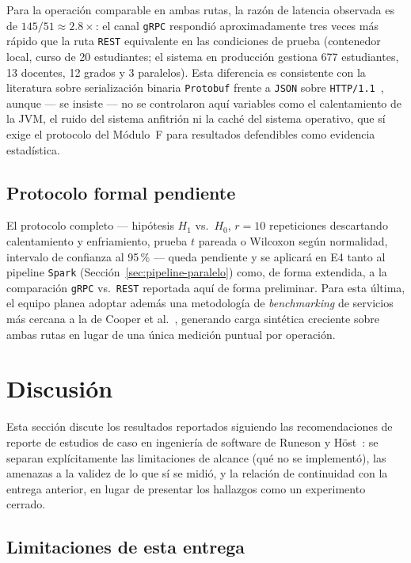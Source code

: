 \documentclass[12pt,a4paper]{article}
\begin{document}
Para la operación comparable en ambas rutas, la razón de latencia observada
es de $145/51 \approx 2.8\times$: el canal \texttt{gRPC} respondió
aproximadamente tres veces más rápido que la ruta \texttt{REST} equivalente
en las condiciones de prueba (contenedor local, curso de 20 estudiantes; el
sistema en producción gestiona 677 estudiantes, 13 docentes, 12 grados y 3
paralelos). Esta diferencia es consistente con la literatura sobre
serialización binaria \texttt{Protobuf} frente a \texttt{JSON} sobre
\texttt{HTTP/1.1}~\cite{fielding2000architectural}, aunque --- se insiste
--- no se controlaron aquí variables como el calentamiento de la JVM, el
ruido del sistema anfitrión ni la caché del sistema operativo, que sí
exige el protocolo del Módulo~F para resultados defendibles como evidencia
estadística.

\subsection{Protocolo formal pendiente}

El protocolo completo --- hipótesis $H_1$ vs.\ $H_0$, $r=10$ repeticiones
descartando calentamiento y enfriamiento, prueba $t$ pareada o Wilcoxon
según normalidad, intervalo de confianza al 95\,\% --- queda pendiente y se
aplicará en E4 tanto al pipeline \texttt{Spark} (Sección~\ref{sec:pipeline-paralelo})
como, de forma extendida, a la comparación \texttt{gRPC} vs.\ \texttt{REST}
reportada aquí de forma preliminar. Para esta última, el equipo planea
adoptar además una metodología de \emph{benchmarking} de servicios más
cercana a la de Cooper et al.~\cite{cooper2010ycsb}, generando carga
sintética creciente sobre ambas rutas en lugar de una única medición
puntual por operación.


\section{Discusión}
\label{sec:discusion}

Esta sección discute los resultados reportados siguiendo las
recomendaciones de reporte de estudios de caso en ingeniería de software de
Runeson y Höst~\cite{runeson2009guidelines}: se separan explícitamente las
limitaciones de alcance (qué no se implementó), las amenazas a la validez
de lo que sí se midió, y la relación de continuidad con la entrega
anterior, en lugar de presentar los hallazgos como un experimento cerrado.

\subsection{Limitaciones de esta entrega}
\end{document}
